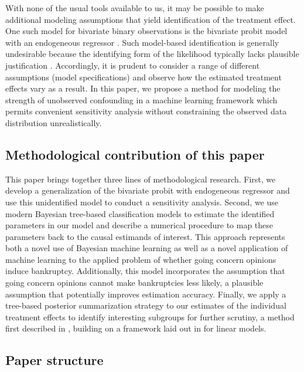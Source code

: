 \documentclass[aoas,preprint, 11pt, dvipsnames, table, x11name]{imsart}
\theoremstyle{remark}
\begin{document}
	With none of the usual tools available to us, it may be possible to make additional modeling assumptions that yield identification of the treatment effect. One such model for bivariate binary observations is the bivariate probit model with an endogeneous regressor \citep[Section~ 15.7.3]{Wooldridge-2010}. Such model-based identification is generally undesirable because the identifying form of the likelihood typically lacks plausible justification \citep{Manski}. Accordingly, it is prudent to consider a range of different assumptions (model specifications) and observe how the estimated treatment effects vary as a result. In this paper, we propose a method for modeling the strength of unobserved confounding in a machine learning framework which permits convenient sensitivity analysis without constraining the observed data distribution unrealistically.
	
	\subsection{Methodological contribution of this paper}
	
	This paper brings together three lines of methodological research. First, we develop a generalization of the bivariate probit with endogeneous regressor and use this unidentified model to conduct a sensitivity analysis. Second, we use modern Bayesian tree-based classification models to estimate the identified parameters in our model and describe a numerical procedure to map these parameters back to the causal estimands of interest. This approach represents both a novel use of Bayesian machine learning as well as a novel application of machine learning to the applied problem of whether going concern opinions induce bankruptcy. Additionally, this model incorporates the assumption that going concern opinions cannot make bankruptcies less likely, a plausible assumption that potentially improves estimation accuracy. Finally, we apply a tree-based posterior summarization strategy to our estimates of the individual treatment effects to identify interesting subgroups for further scrutiny, a method first described in \cite{bcf}, building on a framework laid out in \cite{Hahn-2015} for linear models.
	
	\subsection{Paper structure}
	
\end{document}
